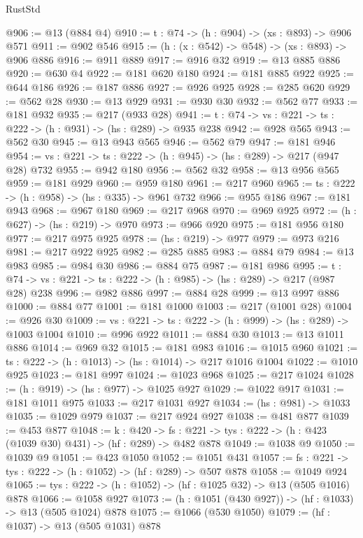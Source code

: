 \begin{lexlean}{RustStd}
\begin{coremodule}
@906 := @13 (@884 @4)
@910 := {t : @74} -> (h : @904) -> (xs : @893) -> @906 @571
@911 := @902 @546
@915 := (h : (x : @542) -> @548) -> (xs : @893) -> @906 @886
@916 := @911 @889
@917 := @916 @32
@919 := @13 @885 @886
@920 := @630 @4
@922 := @181 @620 @180
@924 := @181 @885 @922
@925 := @644 @186
@926 := @187 @886
@927 := @926 @925
@928 := @285 @620
@929 := @562 @28
@930 := @13 @929
@931 := @930 @30
@932 := @562 @77
@933 := @181 @932
@935 := @217 (@933 @28)
@941 := {t : @74} -> {vs : @221} -> {ts : @222} -> (h : @931) -> (hs : @289) -> @935 @238
@942 := @928 @565
@943 := @562 @30
@945 := @13 @943 @565
@946 := @562 @79
@947 := @181 @946
@954 := {vs : @221} -> {ts : @222} -> (h : @945) -> (hs : @289) -> @217 (@947 @28) @732
@955 := @942 @180
@956 := @562 @32
@958 := @13 @956 @565
@959 := @181 @929
@960 := @959 @180
@961 := @217 @960
@965 := {ts : @222} -> (h : @958) -> (hs : @335) -> @961 @732
@966 := @955 @186
@967 := @181 @943
@968 := @967 @180
@969 := @217 @968
@970 := @969 @925
@972 := (h : @627) -> (hs : @219) -> @970
@973 := @966 @920
@975 := @181 @956 @180
@977 := @217 @975 @925
@978 := (hs : @219) -> @977
@979 := @973 @216
@981 := @217 @922 @925
@982 := @285 @885
@983 := @884 @79
@984 := @13 @983
@985 := @984 @30
@986 := @884 @75
@987 := @181 @986
@995 := {t : @74} -> {vs : @221} -> {ts : @222} -> (h : @985) -> (hs : @289) -> @217 (@987 @28) @238
@996 := @982 @886
@997 := @884 @28
@999 := @13 @997 @886
@1000 := @884 @77
@1001 := @181 @1000
@1003 := @217 (@1001 @28)
@1004 := @926 @30
@1009 := {vs : @221} -> {ts : @222} -> (h : @999) -> (hs : @289) -> @1003 @1004
@1010 := @996 @922
@1011 := @884 @30
@1013 := @13 @1011 @886
@1014 := @969 @32
@1015 := @181 @983
@1016 := @1015 @960
@1021 := {ts : @222} -> (h : @1013) -> (hs : @1014) -> @217 @1016 @1004
@1022 := @1010 @925
@1023 := @181 @997
@1024 := @1023 @968
@1025 := @217 @1024
@1028 := (h : @919) -> (hs : @977) -> @1025 @927
@1029 := @1022 @917
@1031 := @181 @1011 @975
@1033 := @217 @1031 @927
@1034 := (hs : @981) -> @1033
@1035 := @1029 @979
@1037 := @217 @924 @927
@1038 := @481 @877
@1039 := @453 @877
@1048 := {k : @420} ->
  {fs : @221} -> {tys : @222} -> (h : @423 (@1039 @30) @431) -> (hf : @289) -> @482 @878
@1049 := @1038 @9
@1050 := @1039 @9
@1051 := @423 @1050
@1052 := @1051 @431
@1057 := {fs : @221} -> {tys : @222} -> (h : @1052) -> (hf : @289) -> @507 @878
@1058 := @1049 @924
@1065 := {tys : @222} -> (h : @1052) -> (hf : @1025 @32) -> @13 (@505 @1016) @878
@1066 := @1058 @927
@1073 := (h : @1051 (@430 @927)) -> (hf : @1033) -> @13 (@505 @1024) @878
@1075 := @1066 (@530 @1050)
@1079 := (hf : @1037) -> @13 (@505 @1031) @878

\end{coremodule}
\end{lexlean}
